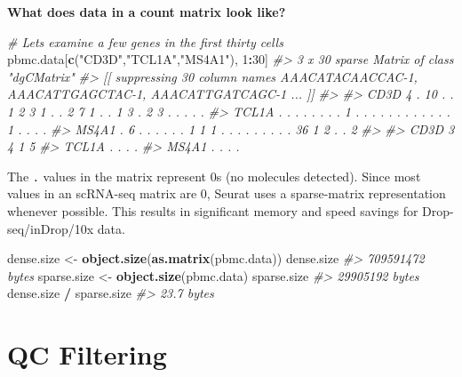 \documentclass[
]{book}
\newenvironment{Shaded}{\begin{snugshade}}{\end{snugshade}}
\newcommand{\CommentTok}[1]{\textcolor[rgb]{0.56,0.35,0.01}{\textit{#1}}}
\newcommand{\DecValTok}[1]{\textcolor[rgb]{0.00,0.00,0.81}{#1}}
\newcommand{\FunctionTok}[1]{\textcolor[rgb]{0.13,0.29,0.53}{\textbf{#1}}}
\newcommand{\NormalTok}[1]{#1}
\newcommand{\OtherTok}[1]{\textcolor[rgb]{0.56,0.35,0.01}{#1}}
\newcommand{\SpecialCharTok}[1]{\textcolor[rgb]{0.81,0.36,0.00}{\textbf{#1}}}
\newcommand{\StringTok}[1]{\textcolor[rgb]{0.31,0.60,0.02}{#1}}
\begin{document}
\textbf{What does data in a count matrix look like?}

\begin{Shaded}
\begin{Highlighting}[]
\CommentTok{\# Lets examine a few genes in the first thirty cells}
\NormalTok{pbmc.data[}\FunctionTok{c}\NormalTok{(}\StringTok{"CD3D"}\NormalTok{,}\StringTok{"TCL1A"}\NormalTok{,}\StringTok{"MS4A1"}\NormalTok{), }\DecValTok{1}\SpecialCharTok{:}\DecValTok{30}\NormalTok{]}
\CommentTok{\#\textgreater{} 3 x 30 sparse Matrix of class "dgCMatrix"}
\CommentTok{\#\textgreater{}   [[ suppressing 30 column names \textquotesingle{}AAACATACAACCAC{-}1\textquotesingle{}, \textquotesingle{}AAACATTGAGCTAC{-}1\textquotesingle{}, \textquotesingle{}AAACATTGATCAGC{-}1\textquotesingle{} ... ]]}
\CommentTok{\#\textgreater{}                                                            }
\CommentTok{\#\textgreater{} CD3D  4 . 10 . . 1 2 3 1 . . 2 7 1 . . 1 3 . 2  3 . . . . .}
\CommentTok{\#\textgreater{} TCL1A . .  . . . . . . 1 . . . . . . . . . . .  . 1 . . . .}
\CommentTok{\#\textgreater{} MS4A1 . 6  . . . . . . 1 1 1 . . . . . . . . . 36 1 2 . . 2}
\CommentTok{\#\textgreater{}              }
\CommentTok{\#\textgreater{} CD3D  3 4 1 5}
\CommentTok{\#\textgreater{} TCL1A . . . .}
\CommentTok{\#\textgreater{} MS4A1 . . . .}
\end{Highlighting}
\end{Shaded}

The \texttt{.} values in the matrix represent 0s (no molecules detected). Since most values in an scRNA-seq matrix are 0, Seurat uses a sparse-matrix representation whenever possible. This results in significant memory and speed savings for Drop-seq/inDrop/10x data.

\begin{Shaded}
\begin{Highlighting}[]
\NormalTok{dense.size }\OtherTok{\textless{}{-}} \FunctionTok{object.size}\NormalTok{(}\FunctionTok{as.matrix}\NormalTok{(pbmc.data))}
\NormalTok{dense.size}
\CommentTok{\#\textgreater{} 709591472 bytes}
\NormalTok{sparse.size }\OtherTok{\textless{}{-}} \FunctionTok{object.size}\NormalTok{(pbmc.data)}
\NormalTok{sparse.size}
\CommentTok{\#\textgreater{} 29905192 bytes}
\NormalTok{dense.size }\SpecialCharTok{/}\NormalTok{ sparse.size}
\CommentTok{\#\textgreater{} 23.7 bytes}
\end{Highlighting}
\end{Shaded}

\hypertarget{qc}{%
\chapter{QC Filtering}\label{qc}}
\end{document}
